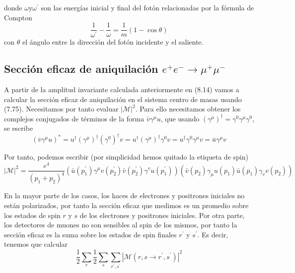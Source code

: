 donde $\omega \mathrm{y} \omega^{\prime}$ son las energías inicial y final del fotón relacionadas por la fórmula de Compton
$$
\frac{1}{\omega^{\prime}}-\frac{1}{\omega}=\frac{1}{m}(1-\cos \theta)
$$
con $\theta$ el ángulo entre la dirección del fotón incidente y el saliente.

\subsection{Sección eficaz de aniquilación $e^{+} e^{-} \rightarrow \mu^{+} \mu^{-}$}

A partir de la amplitud invariante calculada anteriormente en (8.14) vamos a calcular la sección eficaz de aniquilación en el sistema centro de masas usando (7.75). Necesitamos por tanto evaluar $|\mathscr{M}|^{2}$. Para ello necesitamos obtener los complejos conjugados de términos de la forma $\bar{v} \gamma^{\mu} u$, que usando $\left(\gamma^{\mu}\right)^{\dagger}=\gamma^{0} \gamma^{\mu} \gamma^{0}$, se escribe
\begin{equation*}
\left(\bar{v} \gamma^{\mu} u\right)^{*}=u^{\dagger}\left(\gamma^{\mu}\right)^{\dagger}\left(\gamma^{0}\right)^{\dagger} v=u^{\dagger}\left(\gamma^{\mu}\right)^{\dagger} \gamma^{0} v=u^{\dagger} \gamma^{0} \gamma^{\mu} v=\bar{u} \gamma^{\mu} v \tag{8.15}
\end{equation*}

Por tanto, podemos escribir (por simplicidad hemos quitado la etiqueta de spin)
\begin{equation*}
|\mathscr{M}|^{2}=\frac{e^{4}}{\left(p_{1}+p_{2}\right)^{4}}\left(\bar{u}\left(p_{1}^{\prime}\right) \gamma^{\mu} v\left(p_{2}^{\prime}\right) \bar{v}\left(p_{2}^{\prime}\right) \gamma^{v} u\left(p_{1}^{\prime}\right)\right)\left(\bar{v}\left(p_{2}\right) \gamma_{\mu} u\left(p_{1}\right) \bar{u}\left(p_{1}\right) \gamma_{v} v\left(p_{2}\right)\right) \tag{8.16}
\end{equation*}

En la mayor parte de los casos, los haces de electrones y positrones iniciales no están polarizados, por tanto la sección eficaz que medimos es un promedio sobre los estados de spin $r$ y $s$ de los electrones y positrones iniciales. Por otra parte, los detectores de muones no son sensibles al spin de los mismos, por tanto la sección eficaz es la suma sobre los estados de spin finales $r^{\prime}$ y $s^{\prime}$. Es decir, tenemos que calcular
\begin{equation*}
\frac{1}{2} \sum_{r} \frac{1}{2} \sum_{s} \sum_{r^{\prime}, s^{\prime}}\left|\mathscr{M}\left(r, s \rightarrow r^{\prime}, s^{\prime}\right)\right|^{2} \tag{8.17}
\end{equation*}

